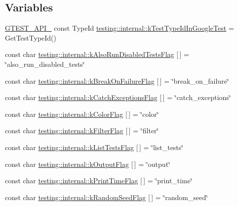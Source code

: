 \subsection*{Variables}
\begin{DoxyCompactItemize}
\item 
\hyperlink{gtest-port_8h_aa73be6f0ba4a7456180a94904ce17790}{G\+T\+E\+S\+T\+\_\+\+A\+P\+I\+\_\+} const Type\+Id \hyperlink{namespacetesting_1_1internal_acac7993efabbd9dd62c1e9c7d143a72f}{testing\+::internal\+::k\+Test\+Type\+Id\+In\+Google\+Test} = Get\+Test\+Type\+Id()
\item 
const char \hyperlink{namespacetesting_1_1internal_ad5882ed0ceadc0f23090f0f08b5d495b}{testing\+::internal\+::k\+Also\+Run\+Disabled\+Tests\+Flag} \mbox{[}$\,$\mbox{]} = \char`\"{}also\+\_\+run\+\_\+disabled\+\_\+tests\char`\"{}
\item 
const char \hyperlink{namespacetesting_1_1internal_a804c907155bfee3a6616ae3ca04048d0}{testing\+::internal\+::k\+Break\+On\+Failure\+Flag} \mbox{[}$\,$\mbox{]} = \char`\"{}break\+\_\+on\+\_\+failure\char`\"{}
\item 
const char \hyperlink{namespacetesting_1_1internal_af4bb309802e83df0927097e6e4201a38}{testing\+::internal\+::k\+Catch\+Exceptions\+Flag} \mbox{[}$\,$\mbox{]} = \char`\"{}catch\+\_\+exceptions\char`\"{}
\item 
const char \hyperlink{namespacetesting_1_1internal_a884ff13b75232fbe7daa0caf46f1de66}{testing\+::internal\+::k\+Color\+Flag} \mbox{[}$\,$\mbox{]} = \char`\"{}color\char`\"{}
\item 
const char \hyperlink{namespacetesting_1_1internal_a8cb8ee7fe7659e6916a0108dffa2f7dc}{testing\+::internal\+::k\+Filter\+Flag} \mbox{[}$\,$\mbox{]} = \char`\"{}filter\char`\"{}
\item 
const char \hyperlink{namespacetesting_1_1internal_a1d3cfebffefbf35f7033d4941493a8ff}{testing\+::internal\+::k\+List\+Tests\+Flag} \mbox{[}$\,$\mbox{]} = \char`\"{}list\+\_\+tests\char`\"{}
\item 
const char \hyperlink{namespacetesting_1_1internal_abd5368e00a31d175c6696cf76cbbde10}{testing\+::internal\+::k\+Output\+Flag} \mbox{[}$\,$\mbox{]} = \char`\"{}output\char`\"{}
\item 
const char \hyperlink{namespacetesting_1_1internal_aa6c13109bb4c78740ddb082b1ec0de56}{testing\+::internal\+::k\+Print\+Time\+Flag} \mbox{[}$\,$\mbox{]} = \char`\"{}print\+\_\+time\char`\"{}
\item 
const char \hyperlink{namespacetesting_1_1internal_a964ad71443cfda304b3208bf5d2daa75}{testing\+::internal\+::k\+Random\+Seed\+Flag} \mbox{[}$\,$\mbox{]} = \char`\"{}random\+\_\+seed\char`\"{}

\end{DoxyCompactItemize}
